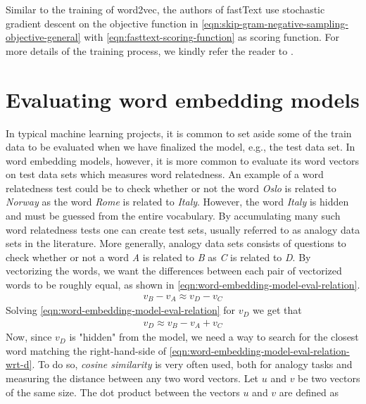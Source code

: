 Similar to the training of word2vec, the authors of fastText use stochastic gradient descent on the objective function in \cref{eqn:skip-gram-negative-sampling-objective-general} with \cref{eqn:fasttext-scoring-function} as scoring function. For more details of the training process, we kindly refer the reader to \cite[4 Experimental setup]{bojanowski2017enriching}.

\section{Evaluating word embedding models}
\label{sec:eval-word2vec-model}
In typical machine learning projects, it is common to set aside some of the train data to be evaluated when we have finalized the model, e.g., the test data set. In word embedding models, however, it is more common to evaluate its word vectors on test data sets which measures word relatedness. An example of a word relatedness test could be to check whether or not the word \textit{Oslo} is related to \textit{Norway} as the word \textit{Rome} is related to \textit{Italy}. However, the word \textit{Italy} is hidden and must be guessed from the entire vocabulary. By accumulating many such word relatedness tests one can create test sets, usually referred to as analogy data sets in the literature. More generally, analogy data sets consists of questions to check whether or not a word \textit{A} is related to \textit{B} as \textit{C} is related to \textit{D}. By vectorizing the words, we want the differences between each pair of vectorized words to be roughly equal, as shown in \cref{eqn:word-embedding-model-eval-relation}.
\begin{align}
    v_{\textit{B}} - v_{\textit{A}} \approx v_{\textit{D}} - v_{\textit{C}}
    \label{eqn:word-embedding-model-eval-relation}
\end{align}
Solving \cref{eqn:word-embedding-model-eval-relation} for $v_{\textit{D}}$ we get that
\begin{align}
    v_{\textit{D}} \approx v_{\textit{B}} - v_{\textit{A}} + v_{\textit{C}}
    \label{eqn:word-embedding-model-eval-relation-wrt-d}
\end{align}
Now, since $v_{\textit{D}}$ is "hidden" from the model, we need a way to search for the closest word matching the right-hand-side of \cref{eqn:word-embedding-model-eval-relation-wrt-d}. To do so, \textit{cosine similarity} is very often used, both for analogy tasks and measuring the distance between any two word vectors. Let $u$ and $v$ be two vectors of the same size. The dot product between the vectors $u$ and $v$ are defined as
